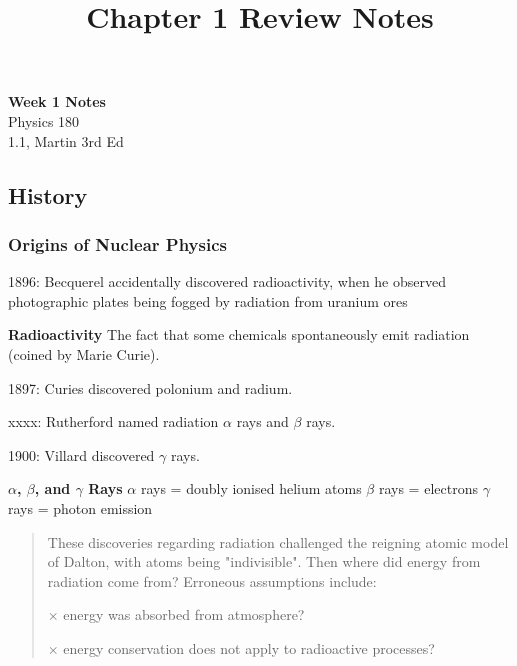 \documentclass[11pt]{article}
\theoremstyle{definition}
\begin{document}
\setcounter{section}{1}
\title{Chapter 1 Review Notes}


\begin{center}
{\LARGE \bf Week 1 Notes}\\
{\large Physics 180}\\
1.1, Martin 3rd Ed
\end{center}


\subsection{History}
\subsubsection{Origins of Nuclear Physics}
1896: Becquerel accidentally discovered radioactivity, when he observed photographic plates being fogged by radiation from uranium ores

\begin{shaded}
    \textbf{Radioactivity} \newline
    The fact that some chemicals spontaneously emit radiation  (coined by Marie Curie).
\end{shaded}

1897: Curies discovered polonium and radium.


xxxx: Rutherford named radiation $\alpha$ rays and $\beta$ rays.


1900: Villard discovered $\gamma$ rays.

\begin{shaded}
\noindent\textbf{$\alpha$, $\beta$, and $\gamma$ Rays} \newline
    $\alpha$ rays = doubly ionised helium atoms \newline
    $\beta$ rays = electrons \newline 
    $\gamma$ rays = photon emission
\end{shaded}

\begin{quote}
    These discoveries regarding radiation challenged the reigning atomic model of Dalton, with atoms being "indivisible". Then where did energy from radiation come from? Erroneous assumptions include:

    $\times$ energy was absorbed from atmosphere?

    $\times$ energy conservation does not apply to radioactive processes?
\end{quote}
\end{document}
